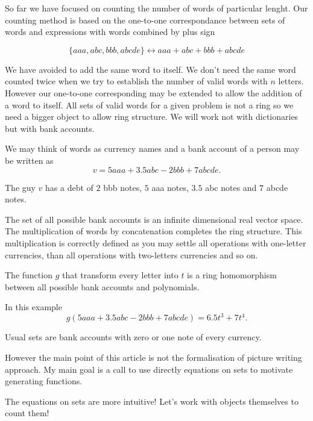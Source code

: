 \documentclass{article}
\begin{document}
So far we have focused on counting the number of words of particular lenght. 
Our counting method is based on the one-to-one correspondance between sets of words and expressions with words combined by plus sign

\[
\{ aaa, abc, bbb, abcde \}  \leftrightarrow aaa + abc + bbb + abcde
\]

We have avoided to add the same word to itself. 
We don't need the same word counted twice when we try to establish the number of valid words with $n$ letters. 
However our one-to-one corresponding may be extended to allow the addition of a word to itself. 
All sets of valid words for a given problem is not a ring so we need a bigger object to allow ring structure.
We will work not with dictionaries but with bank accounts. 

We may think of words as currency names and a bank account of a person may be written as
\[
v = 5 aaa + 3.5 abc - 2 bbb + 7 abcde.
\]

The guy $v$ has a debt of $2$ bbb notes, $5$ aaa notes, $3.5$ abc notes and $7$ abcde notes.

The set of all possible bank accounts is an infinite dimensional real vector space. 
The multiplication of words by concatenation completes the ring structure. 
This multiplication is correctly defined as you may settle all operations with one-letter currencies, 
than all operations with two-letters currencies and so on.

The function $g$ that transform every letter into $t$ is a ring homomorphism between all possible bank accounts and polynomials. 

In this example
\[
g(5 aaa + 3.5 abc - 2 bbb + 7 abcde) = 6.5 t^3  + 7 t^4.
\]

Usual sets are bank accounts with zero or one note of every currency. 

However the main point of this article is not the formalisation of picture writing approach.
My main goal is a call to use directly equations on sets to motivate generating functions. 


The equations on sets are more intuitive! 
Let's work with objects themselves to count them! 








\end{document}
